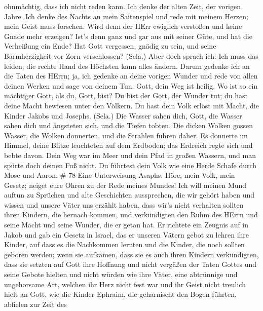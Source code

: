 ohnmächtig, dass ich nicht reden kann.  Ich denke der alten
Zeit, der vorigen Jahre.  Ich denke des Nachts an mein
Saitenspiel und rede mit meinem Herzen; mein Geist muss forschen.
 Wird denn der HErr ewiglich verstoßen und keine Gnade mehr
erzeigen?  Ist's denn ganz und gar aus mit seiner Güte, und
hat die Verheißung ein Ende?  Hat Gott vergessen, gnädig zu
sein, und seine Barmherzigkeit vor Zorn verschlossen? (Sela.)
 Aber doch sprach ich: Ich muss das leiden; die rechte Hand
des Höchsten kann alles ändern.  Darum gedenke ich an die
Taten des HErrn; ja, ich gedenke an deine vorigen Wunder 
und rede von allen deinen Werken und sage von deinem Tun. 
Gott, dein Weg ist heilig. Wo ist so ein mächtiger Gott, als du, Gott,
bist?  Du bist der Gott, der Wunder tut; du hast deine
Macht bewiesen unter den Völkern.  Du hast dein Volk erlöst
mit Macht, die Kinder Jakobs und Josephs. (Sela.)  Die
Wasser sahen dich, Gott, die Wasser sahen dich und ängsteten sich, und
die Tiefen tobten.  Die dicken Wolken gossen Wasser, die
Wolken donnerten, und die Strahlen fuhren daher.  Es
donnerte im Himmel, deine Blitze leuchteten auf dem Erdboden; das
Erdreich regte sich und bebte davon.  Dein Weg war im Meer
und dein Pfad in großen Wassern, und man spürte doch deinen Fuß nicht.
 Du führtest dein Volk wie eine Herde Schafe durch Mose und
Aaron. \# 78  Eine Unterweisung Asaphs. Höre, mein Volk,
mein Gesetz; neiget eure Ohren zu der Rede meines Mundes! 
Ich will meinen Mund auftun zu Sprüchen und alte Geschichten
aussprechen,  die wir gehört haben und wissen und unsere
Väter uns erzählt haben,  dass wir's nicht verhalten sollten
ihren Kindern, die hernach kommen, und verkündigten den Ruhm des HErrn
und seine Macht und seine Wunder, die er getan hat.  Er
richtete ein Zeugnis auf in Jakob und gab ein Gesetz in Israel, das er
unseren Vätern gebot zu lehren ihre Kinder,  auf dass es die
Nachkommen lernten und die Kinder, die noch sollten geboren werden; wenn
sie aufkämen, dass sie es auch ihren Kindern verkündigten, 
dass sie setzten auf Gott ihre Hoffnung und nicht vergäßen der Taten
Gottes und seine Gebote hielten  und nicht würden wie ihre
Väter, eine abtrünnige und ungehorsame Art, welchen ihr Herz nicht fest
war und ihr Geist nicht treulich hielt an Gott,  wie die
Kinder Ephraim, die geharnischt den Bogen führten, abfielen zur Zeit des

